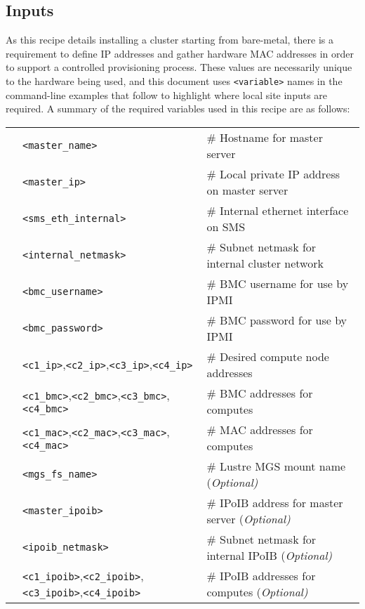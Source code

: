 \subsection{Inputs}
As this recipe details installing a cluster
starting from bare-metal, there is a requirement to define IP addresses and gather
hardware MAC addresses in order to support a controlled provisioning process. These values
are necessarily unique to the hardware being used, and this document uses \texttt{<variable>}
names in the command-line examples that follow to highlight where local site
inputs are required. A summary of the required variables used in this recipe
are as follows: \\

\vspace*{0.2cm}
\begin{tabular}{@{}>{\textbullet}cll@{}}
& \texttt{<master\_name>}  & {\small \# Hostname for master server} \\
& \texttt{<master\_ip>} & {\small \# Local private IP address on master server} \\
& \texttt{<sms\_eth\_internal>} & {\small \# Internal ethernet interface on SMS} \\
& \texttt{<internal\_netmask>} & {\small \# Subnet netmask for internal cluster network} \\
& \texttt{<bmc\_username>} & {\small \# BMC username for use by IPMI} \\
& \texttt{<bmc\_password>} & {\small \# BMC password for use by IPMI} \\
& \texttt{<c1\_ip>},\texttt{<c2\_ip>},\texttt{<c3\_ip>},\texttt{<c4\_ip>}
& {\small \# Desired compute node addresses} \\
& \texttt{<c1\_bmc>},\texttt{<c2\_bmc>},\texttt{<c3\_bmc>},\texttt{<c4\_bmc>}
& {\small \# BMC addresses for computes} \\
& \texttt{<c1\_mac>},\texttt{<c2\_mac>},\texttt{<c3\_mac>},\texttt{<c4\_mac>}
& {\small \# MAC addresses for computes} \\
& \texttt{<mgs\_fs\_name>} & {\small \# Lustre MGS mount name (\em Optional)} \\
& \texttt{<master\_ipoib>} & {\small \# IPoIB address for master server (\em Optional)} \\
& \texttt{<ipoib\_netmask>} & {\small \# Subnet netmask for internal IPoIB (\em Optional)} \\
& \texttt{<c1\_ipoib>},\texttt{<c2\_ipoib>},\texttt{<c3\_ipoib>},\texttt{<c4\_ipoib>}
& {\small \# IPoIB addresses for computes (\em Optional)}\\

\end{tabular}
